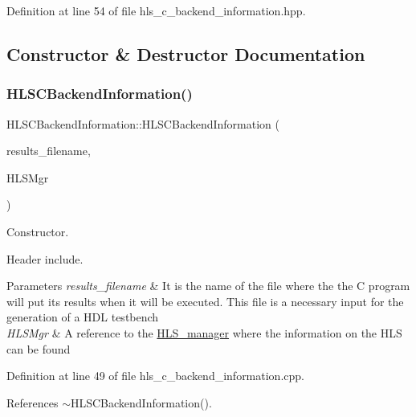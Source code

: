 Definition at line 54 of file hls\+\_\+c\+\_\+backend\+\_\+information.\+hpp.



\subsection{Constructor \& Destructor Documentation}
\mbox{\label{classHLSCBackendInformation_aa7c6657e78ed9a50ce7f049e3ffd53a6}} 
\subsubsection{\texorpdfstring{H\+L\+S\+C\+Backend\+Information()}{HLSCBackendInformation()}}
{\footnotesize\ttfamily H\+L\+S\+C\+Backend\+Information\+::\+H\+L\+S\+C\+Backend\+Information (\begin{DoxyParamCaption}\item[{std\+::string}]{results\+\_\+filename,  }\item[{const \hyperlink{hls__manager_8hpp_a1b481383e3beabc89bd7562ae672dd8c}{H\+L\+S\+\_\+manager\+Const\+Ref} \&}]{H\+L\+S\+Mgr }\end{DoxyParamCaption})}



Constructor. 

Header include.


\begin{DoxyParams}{Parameters}
{\em results\+\_\+filename} & It is the name of the file where the the C program will put its results when it will be executed. This file is a necessary input for the generation of a H\+DL testbench \\
\hline
{\em H\+L\+S\+Mgr} & A reference to the \hyperlink{classHLS__manager}{H\+L\+S\+\_\+manager} where the information on the H\+LS can be found \\
\hline
\end{DoxyParams}


Definition at line 49 of file hls\+\_\+c\+\_\+backend\+\_\+information.\+cpp.



References $\sim$\+H\+L\+S\+C\+Backend\+Information().

